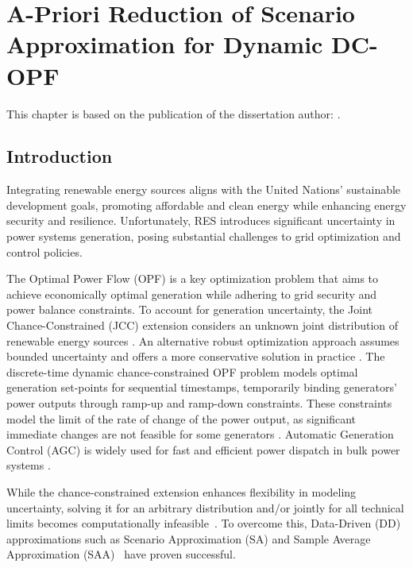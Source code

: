 \chapter{A-Priori Reduction of Scenario Approximation for Dynamic DC-OPF}
This chapter is based on the publication of the dissertation author: . 
\label{chap:apriori_stochastic_approx}

\section{Introduction}
\label{sec:introduction}
\vspace{-1mm}
Integrating renewable energy sources aligns with the United Nations' sustainable development goals, promoting affordable and clean energy while enhancing energy security and resilience. Unfortunately, RES introduces significant uncertainty in power systems generation, posing substantial challenges to grid optimization and control policies.

The Optimal Power Flow (OPF) \cite{stott2012optimal} is a key optimization problem that aims to achieve economically optimal generation while adhering to grid security and power balance constraints. To account for generation uncertainty, the Joint Chance-Constrained (JCC) extension considers an unknown joint distribution of renewable energy sources \cite{geng2019data, bienstock2014chance}. An alternative robust optimization approach assumes bounded uncertainty and offers a more conservative solution in practice \cite{ben2002robust, ding2016adjustable}.
%
The discrete-time dynamic chance-constrained OPF problem \cite{lou2019multi, capitanescu2007improving, monticelli1987security} models optimal generation set-points for sequential timestamps, temporarily binding generators' power outputs through ramp-up and ramp-down constraints. These constraints model the limit of the rate of change of the power output, as significant immediate changes are not feasible for some generators \cite{frangioni2008solving}. Automatic Generation Control (AGC) is widely used for fast and efficient power dispatch in bulk power systems \cite{xu2017real}.



While the chance-constrained extension enhances flexibility in modeling uncertainty, solving it for an arbitrary distribution and/or jointly for all technical limits becomes computationally infeasible~\cite{nemirovski2012safe, jia2021iterative}. To overcome this, Data-Driven (DD) approximations such as Scenario Approximation (SA) \cite{calafiore2006scenario} and Sample Average Approximation (SAA)~\cite{ahmed2008solving} have proven successful.

